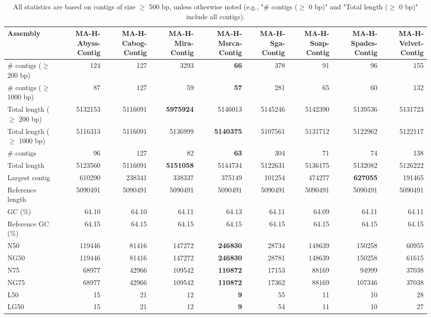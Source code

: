 \documentclass[12pt,a4paper]{article}
\begin{document}
\begin{table}[ht]
\begin{center}
\caption{All statistics are based on contigs of size $\geq$ 500 bp, unless otherwise noted (e.g., "\# contigs ($\geq$ 0 bp)" and "Total length ($\geq$ 0 bp)" include all contigs).}
\begin{tabular}{|l*{8}{|r}|}
\hline
Assembly & MA-H-Abyss-Contig & MA-H-Cabog-Contig & MA-H-Mira-Contig & MA-H-Msrca-Contig & MA-H-Sga-Contig & MA-H-Soap-Contig & MA-H-Spades-Contig & MA-H-Velvet-Contig \\ \hline
\# contigs ($\geq$ 200 bp) & 124 & 127 & 3293 & {\bf 66} & 378 & 91 & 96 & 155 \\ \hline
\# contigs ($\geq$ 1000 bp) & 87 & 127 & 59 & {\bf 57} & 281 & 65 & 60 & 132 \\ \hline
Total length ($\geq$ 200 bp) & 5132153 & 5116091 & {\bf 5975924} & 5146013 & 5145246 & 5142390 & 5139536 & 5131723 \\ \hline
Total length ($\geq$ 1000 bp) & 5116313 & 5116091 & 5136999 & {\bf 5140375} & 5107561 & 5131712 & 5122962 & 5122117 \\ \hline
\# contigs & 96 & 127 & 82 & {\bf 63} & 304 & 71 & 74 & 138 \\ \hline
Total length & 5123560 & 5116091 & {\bf 5151058} & 5144734 & 5122631 & 5136175 & 5132082 & 5126222 \\ \hline
Largest contig & 610290 & 238341 & 338337 & 375149 & 101254 & 474277 & {\bf 627055} & 191465 \\ \hline
Reference length & 5090491 & 5090491 & 5090491 & 5090491 & 5090491 & 5090491 & 5090491 & 5090491 \\ \hline
GC (\%) & 64.10 & 64.10 & 64.11 & 64.13 & 64.11 & 64.09 & 64.11 & 64.11 \\ \hline
Reference GC (\%) & 64.15 & 64.15 & 64.15 & 64.15 & 64.15 & 64.15 & 64.15 & 64.15 \\ \hline
N50 & 119446 & 81416 & 147272 & {\bf 246830} & 28734 & 148639 & 150258 & 60955 \\ \hline
NG50 & 119446 & 81416 & 147272 & {\bf 246830} & 28781 & 148639 & 150258 & 61615 \\ \hline
N75 & 68977 & 42966 & 109542 & {\bf 110872} & 17153 & 88169 & 94999 & 37038 \\ \hline
NG75 & 68977 & 42966 & 109542 & {\bf 110872} & 17362 & 88169 & 107346 & 37038 \\ \hline
L50 & 15 & 21 & 12 & {\bf 9} & 55 & 11 & 10 & 28 \\ \hline
LG50 & 15 & 21 & 12 & {\bf 9} & 54 & 11 & 10 & 27 \\ \hline

\end{tabular}
\end{center}
\end{table}
\end{document}
